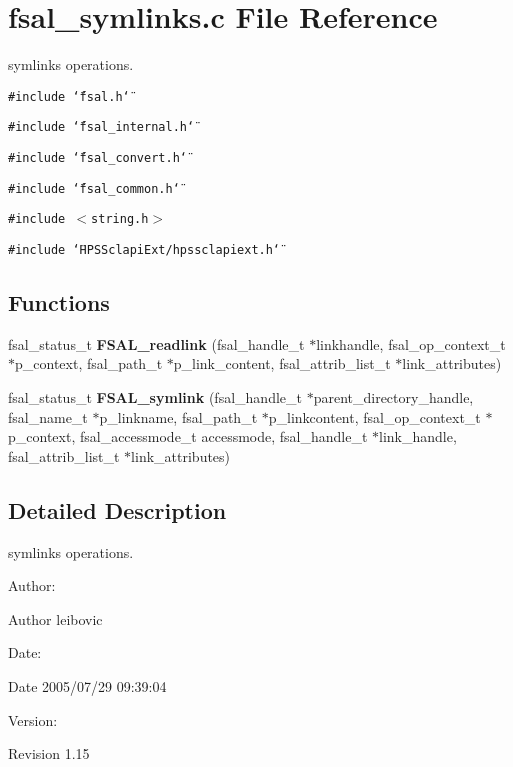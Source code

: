 \section{fsal\_\-symlinks.c File Reference}
\label{fsal__symlinks_8c}
symlinks operations. 

{\tt \#include \char`\"{}fsal.h\char`\"{}}\par
{\tt \#include \char`\"{}fsal\_\-internal.h\char`\"{}}\par
{\tt \#include \char`\"{}fsal\_\-convert.h\char`\"{}}\par
{\tt \#include \char`\"{}fsal\_\-common.h\char`\"{}}\par
{\tt \#include $<$string.h$>$}\par
{\tt \#include \char`\"{}HPSSclapi\-Ext/hpssclapiext.h\char`\"{}}\par
\subsection*{Functions}
\begin{CompactItemize}
\item 
fsal\_\-status\_\-t {\bf FSAL\_\-readlink} (fsal\_\-handle\_\-t $\ast$linkhandle, fsal\_\-op\_\-context\_\-t $\ast$p\_\-context, fsal\_\-path\_\-t $\ast$p\_\-link\_\-content, fsal\_\-attrib\_\-list\_\-t $\ast$link\_\-attributes)
\item 
fsal\_\-status\_\-t {\bf FSAL\_\-symlink} (fsal\_\-handle\_\-t $\ast$parent\_\-directory\_\-handle, fsal\_\-name\_\-t $\ast$p\_\-linkname, fsal\_\-path\_\-t $\ast$p\_\-linkcontent, fsal\_\-op\_\-context\_\-t $\ast$p\_\-context, fsal\_\-accessmode\_\-t accessmode, fsal\_\-handle\_\-t $\ast$link\_\-handle, fsal\_\-attrib\_\-list\_\-t $\ast$link\_\-attributes)
\end{CompactItemize}


\subsection{Detailed Description}
symlinks operations. 

\begin{Desc}
\item[Author:]\begin{Desc}
\item[Author]leibovic \end{Desc}
\end{Desc}
\begin{Desc}
\item[Date:]\begin{Desc}
\item[Date]2005/07/29 09:39:04 \end{Desc}
\end{Desc}
\begin{Desc}
\item[Version:]\begin{Desc}
\item[Revision]1.15 \end{Desc}
\end{Desc}


